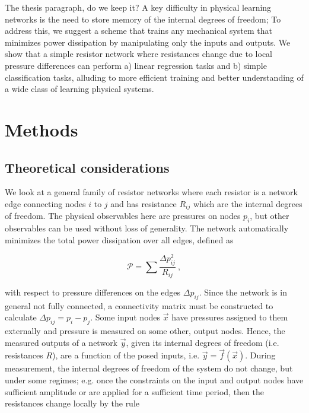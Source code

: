 \documentclass[%
 reprint,
 amsmath,amssymb,
 aps,
]{revtex4-2}
\begin{document}
    \textcolor{roie}{The thesis paragraph, do we keep it? A key difficulty in physical learning networks is the need to store memory of the internal degrees of freedom; To address this, we suggest a scheme that trains any mechanical system that minimizes power dissipation by manipulating only the inputs and outputs. We show that a simple resistor network where resistances change due to local pressure differences can perform a) linear regression tasks and b) simple classification tasks, alluding to more efficient training and better understanding of a wide class of learning physical systems.

\section{Methods}\label{sec:Methods}

\subsection{Theoretical considerations}\label{sec:theoretical}

    We look at a general family of resistor networks where each resistor is a network edge connecting nodes $i$ to $j$ and has resistance $R_{ij}$ which are the internal degrees of freedom. The physical observables here are pressures on nodes $p_i$, but other observables can be used without loss of generality. The network automatically minimizes the total power dissipation over all edges, defined as
    
    \begin{equation}\label{eq:power_dissipation}
        \mathcal{P}=\sum \frac{\Delta p_{ij}^2}{R_{ij}} \ ,
    \end{equation}

    with respect to pressure differences on the edges $\Delta p_{ij}$. 
    Since the network is in general not fully connected, a connectivity matrix must be constructed to calculate $\Delta p_{ij}=p_i-p_j$. Some input nodes $\vec{x}$ have pressures assigned to them externally and pressure is measured on some other, output nodes. Hence, the measured outputs of a network $\vec{y}$, given its internal degrees of freedom (i.e. resistances $R$), are a function of the posed inputs, i.e. $\vec{y}=\vec{f}\left(\vec{x}\right)$.  
    During measurement, the internal degrees of freedom of the system do not change, but under some regimes; e.g. once the constraints on the input and output nodes have sufficient amplitude or are applied for a sufficient time period, then the resistances change locally by the rule

}
\end{document}
